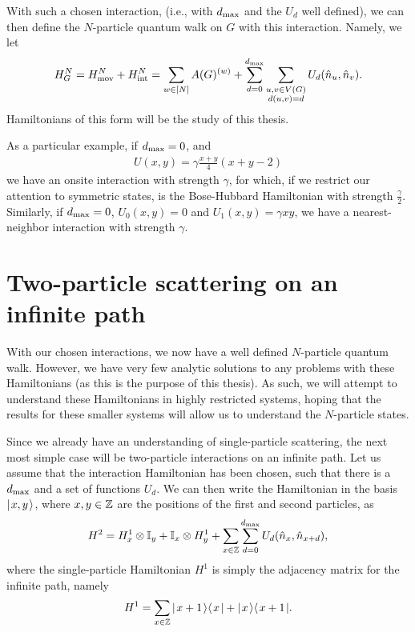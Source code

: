 \documentclass[../thesis-main/thesis-main]{subfiles}
\begin{document}
With such a chosen interaction, (i.e., with $d_{\text{max}}$ and the $U_d$ well defined), we can then define the $N$-particle quantum walk on $G$ with this interaction.  Namely, we let 
\begin{align}
  H_G^N = H_{\text{mov}}^N + H_{\text{int}}^N = \sum_{w\in [N]} A(G)^{(w)} + \sum_{d=0}^{d_{\text{max}}}  \sum_{\substack{ u,v\in V(G)\\d(u,v) = d}}U_{d} (\hat{n}_u,\hat{n}_v). 
  \label{eq:MPQW_H_defn}
\end{align}
Hamiltonians of this form will be the study of this thesis.


As a particular example, if $d_{\text{max}} = 0$, and 
\begin{align}
  U(x,y) = \gamma \frac{x + y}{4} (x + y -2)
\end{align}
we have an onsite interaction with strength $\gamma$, for which, if we restrict our attention to symmetric states, is the Bose-Hubbard Hamiltonian with strength $\frac{\gamma}{2}$.  Similarly, if $d_{\text{max}} = 0$, $U_0 (x,y) = 0$ and $U_1(x,y) = \gamma xy$, we have a nearest-neighbor interaction with strength $\gamma$.




\section{Two-particle scattering on an infinite path}

With our chosen interactions, we now have a well defined $N$-particle quantum walk.  However, we have very few analytic solutions to any problems with these Hamiltonians (as this is the purpose of this thesis).  As such, we will attempt to understand these Hamiltonians in highly restricted systems, hoping that the results for these smaller systems will allow us to understand the $N$-particle states.

Since we already have an understanding of single-particle scattering, the next most simple case will be two-particle interactions on an infinite path.  Let us assume that the interaction Hamiltonian has been chosen, such that there is a $d_{\text{max}}$ and a set of functions $U_d$.  We can then write the Hamiltonian  in the basis $|\mspace{2mu} x,y \mspace{2mu} \rangle$, where $x,y\in \mathbb{Z}$ are the positions of the first and second particles, as
\begin{align}
  H^{2} = H^1_{x} \otimes \mathbb{I}_y + \mathbb{I}_x \otimes H^1_y + \sum_{x\in \mathbb{Z}} \sum_{d=0}^{d_{\text{max}}} U_{d} (\hat{n}_x,\hat{n}_{x+d}) ,
  \label{eq:two_part_H}
\end{align}
where the single-particle Hamiltonian $H^1$ is simply the adjacency matrix for the infinite path, namely
\begin{align}
  H^{1} = \sum_{x\in\mathbb{Z}} |\mspace{2mu} x+1 \mspace{2mu} \rangle\langle\mspace{2mu} x \mspace{2mu} | + |\mspace{2mu} x \mspace{2mu} \rangle\langle\mspace{2mu} x+1 \mspace{2mu} |.
\end{align}
\end{document}
